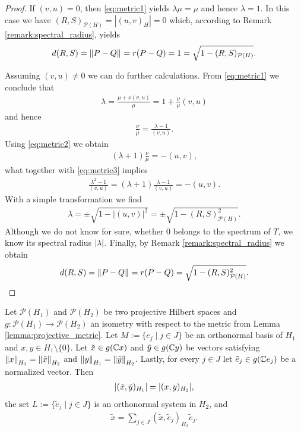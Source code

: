 \begin{proof}
	If $(v,u) = 0$, then \eqref{eq:metric1} yields $\lambda \mu = \mu$ and hence $\lambda = 1$. In this case we have $(R,S)_{\mathcal{P}(H)} = |(u,v)_H| = 0$ which, according to Remark \ref{remark:spectral_radius}, yields 
	\begin{align*}
		d(R,S) = \norm{P - Q} = r(P - Q) = 1 = \sqrt{1 - (R,S)_{\mathcal{P}(H)}}.
	\end{align*}
	
	Assuming $(v,u) \neq 0$ we can do further calculations. From \eqref{eq:metric1} we conclude that
	\begin{align*}
		\lambda = \frac{\mu + \nu (v,u)}{\mu} = 1 + \frac{\nu}{\mu} (v,u) 
	\end{align*}
	and hence
	\begin{align}
		\frac{\nu}{\mu} = \frac{\lambda - 1}{(v,u)}. \label{eq:metric3}
	\end{align}
	Using \eqref{eq:metric2} we obtain
	\begin{align*}
		 (\lambda + 1) \frac{\nu}{\mu} =  -(u,v), 
	\end{align*}
	what together with \eqref{eq:metric3} implies
	\begin{align*}
			\frac{\lambda^2 - 1}{(v,u)} = (\lambda + 1) \frac{\lambda - 1}{(v,u)} =  - (u,v).
	\end{align*}
	With a simple transformation we find
	\begin{align*}
		\lambda = \pm \sqrt{1 - |(u,v)|^2} = \pm \sqrt{1 - (R,S)_{\mathcal{P}(H)}^2}.
	\end{align*}
	Although we do not know for sure, whether $0$ belongs to the spectrum of $T$, we know its spectral radius $\vbraces{\lambda}$. Finally, by Remark \ref{remark:spectral_radius} we obtain
	\begin{align*}
		d(R,S) = \norm{P - Q} = r(P - Q) = \sqrt{1 - (R,S)_{\mathcal{P}(H)}^2}.
	\end{align*}
\end{proof}


\begin{lemma}
	Let $\mathcal{P}(H_1)$ and $\mathcal{P}(H_2)$ be two projective Hilbert spaces and $g: \mathcal{P}(H_1) \to \mathcal{P}(H_2)$ an isometry with respect to the metric from Lemma \ref{lemma:projective_metric}. Let $M := \{e_j \mid j \in J\}$ be an orthonormal basis of $H_1$ and $x,y \in H_1 \setminus \{0\} $. Let $\tilde{x} \in g(\C x)$ and $\tilde{y} \in g(\C y)$  be vectors satisfying $\norm[H_1]{x} = \norm[H_2]{\tilde{x}}$ and $\norm[H_1]{y} = \norm[H_2]{\tilde{y}}$. Lastly, for every $j \in J$ let $\tilde{e}_j \in g(\C e_j)$ be a normalized vector. Then
	\begin{align} 
		\vbraces{(\tilde{x}, \tilde{y})_{H_1}} = \vbraces{(x, y)_{H_2}} \label{eq:vector_isometry},
	\end{align}
	the set $L:=\{\tilde{e}_j \mid j \in J\}$ is an orthonormal system in $H_2$, and 
	\begin{align}
	\tilde{x} = \sum_{j \in J} (\tilde{x}, \tilde{e}_j)_{H_2} \tilde{e}_j. \label{eq:ran_fourier}
	\end{align} 
\end{lemma}

